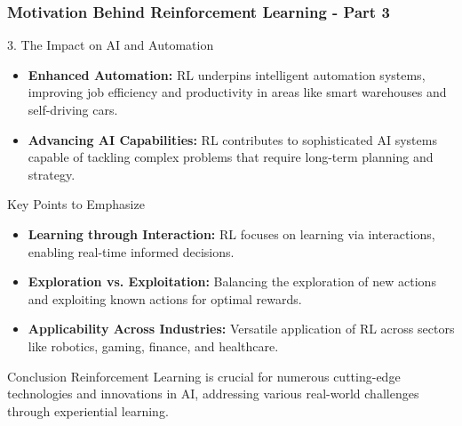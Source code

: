 \documentclass[aspectratio=169]{beamer}
\begin{document}
\begin{frame}[fragile]
    \frametitle{Motivation Behind Reinforcement Learning - Part 3}
    \begin{block}{3. The Impact on AI and Automation}
        \begin{itemize}
            \item \textbf{Enhanced Automation:}
            RL underpins intelligent automation systems, improving job efficiency and productivity in areas like smart warehouses and self-driving cars.
            
            \item \textbf{Advancing AI Capabilities:}
            RL contributes to sophisticated AI systems capable of tackling complex problems that require long-term planning and strategy.
        \end{itemize}
    \end{block}

    \begin{block}{Key Points to Emphasize}
        \begin{itemize}
            \item \textbf{Learning through Interaction:} RL focuses on learning via interactions, enabling real-time informed decisions.
            \item \textbf{Exploration vs. Exploitation:} Balancing the exploration of new actions and exploiting known actions for optimal rewards.
            \item \textbf{Applicability Across Industries:} Versatile application of RL across sectors like robotics, gaming, finance, and healthcare.
        \end{itemize}
    \end{block}

    \begin{block}{Conclusion}
        Reinforcement Learning is crucial for numerous cutting-edge technologies and innovations in AI, addressing various real-world challenges through experiential learning.
    \end{block}
\end{frame}
\end{document}
